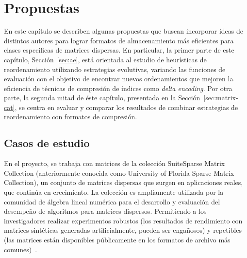 \chapter{Propuestas}\label{ch:propuestas}

En este capítulo se describen algunas propuestas que buscan incorporar ideas de distintos autores para lograr formatos de almacenamiento más eficientes para clases específicas de matrices dispersas. En particular, la primer parte de este capítulo, Sección~\ref{sec:ae}, está orientada al estudio de heurísticas de reordenamiento utilizando estrategias evolutivas, variando las funciones de evaluación con el objetivo de encontrar nuevos ordenamientos que mejoren la eficiencia de técnicas de compresión de índices como \textit{delta encoding}. Por otra parte, la segunda mitad de éste capítulo, presentada en la Sección~\ref{sec:matrix-cat}, se centra en evaluar y comparar los resultados de combinar estrategias de reordenamiento con formatos de compresión.


\section*{Casos de estudio}
En el proyecto, se trabaja con matrices de la colección SuiteSparse Matrix Collection \cite{SuiteSparse} %
(anteriormente conocida como University of Florida Sparse Matrix Collection), un conjunto de matrices dispersas que surgen en aplicaciones reales, que continúa en crecimiento. La colección es ampliamente utilizada por la comunidad de álgebra lineal numérica para el desarrollo y evaluación del desempeño de algoritmos para matrices dispersos. Permitiendo a los investigadores realizar experimentos robustos (los resultados de rendimiento con matrices sintéticas generadas artificialmente, pueden ser engañosos) y repetibles (las matrices están disponibles públicamente en los formatos de archivo más comunes)~\cite{SuiteSparse-web}.


